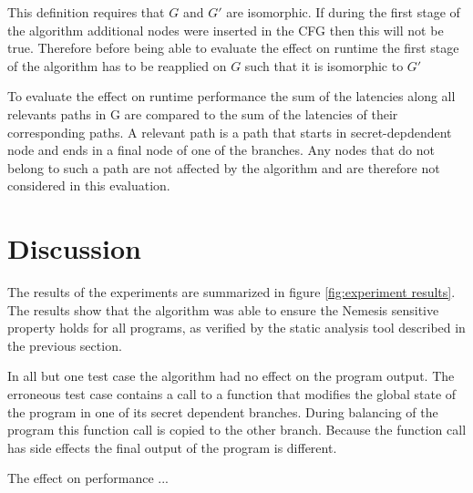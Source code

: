 This definition requires that $G$ and $G'$ are isomorphic. If during the first stage of the algorithm additional nodes were inserted in the CFG
then this will not be true. Therefore before being able to evaluate the effect on runtime the first stage of the algorithm has to be reapplied on $G$ such 
that it is isomorphic to $G'$

To evaluate the effect on runtime performance the sum of the latencies along all relevants paths in G are compared to the sum of the latencies of their corresponding paths. A relevant path is a path that starts in secret-depdendent node and ends in a final node of one of the branches. Any nodes that do not belong to such a path 
are not affected by the algorithm and are therefore not considered in this evaluation. 

    
\section{Discussion}

The results of the experiments are summarized in figure \ref{fig:experiment results}. 
The results show that  the algorithm was able to ensure the Nemesis sensitive property holds for all programs, as verified by the static analysis tool described in the previous section. 

In all but one test case the algorithm had no effect on the program output. 
The erroneous test case contains a call to a function that modifies the global state of the program in one of its secret dependent branches. 
During balancing of the program this function call is copied to the other branch. 
Because the function call has side effects the final output of the program is different. 


The effect on performance ... 

